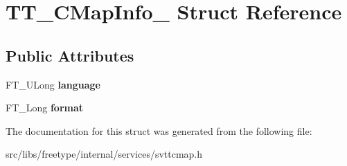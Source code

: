 \hypertarget{struct_t_t___c_map_info__}{
\section{TT\_\-CMapInfo\_\- Struct Reference}
\label{struct_t_t___c_map_info__}
}
\subsection*{Public Attributes}
\begin{DoxyCompactItemize}
\item 
\hypertarget{struct_t_t___c_map_info___a4096f460af57f87cb9434a411c502d86}{
FT\_\-ULong {\bfseries language}}
\label{struct_t_t___c_map_info___a4096f460af57f87cb9434a411c502d86}

\item 
\hypertarget{struct_t_t___c_map_info___a122d56b4755597f134fcf4865cb0a4fc}{
FT\_\-Long {\bfseries format}}
\label{struct_t_t___c_map_info___a122d56b4755597f134fcf4865cb0a4fc}

\end{DoxyCompactItemize}


The documentation for this struct was generated from the following file:\begin{DoxyCompactItemize}
\item 
src/libs/freetype/internal/services/svttcmap.h\end{DoxyCompactItemize}
